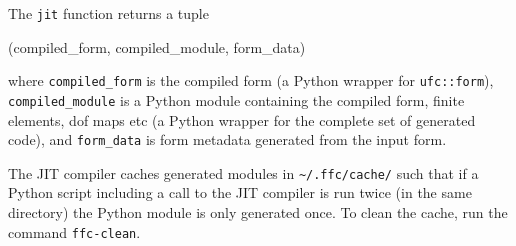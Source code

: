 The \texttt{jit} function returns a tuple
\begin{code}
(compiled_form, compiled_module, form_data)
\end{code}
where \texttt{compiled\_form} is the compiled form (a Python wrapper
for \texttt{ufc::form}), \texttt{compiled\_module} is a Python module
containing the compiled form, finite elements, dof maps etc (a Python
wrapper for the complete set of generated code), and
\texttt{form\_data} is form metadata generated from the input form.

The JIT compiler caches generated modules in \texttt{\~{}/.ffc/cache/}
such that if a Python script including a call to the JIT compiler is
run twice (in the same directory) the Python module is only generated
once. To clean the cache, run the command \texttt{ffc-clean}.
